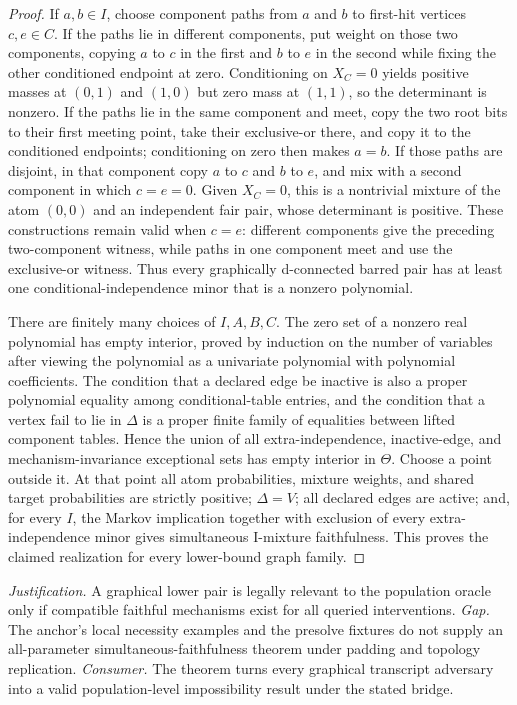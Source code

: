 \documentclass{article}
\begin{document}
\begin{proof}
If \(a,b\in I\), choose component paths from \(a\) and \(b\) to first-hit vertices \(c,e\in C\). If the paths lie in different components, put weight on those two components, copying \(a\) to \(c\) in the first and \(b\) to \(e\) in the second while fixing the other conditioned endpoint at zero. Conditioning on \(X_C=0\) yields positive masses at \((0,1)\) and \((1,0)\) but zero mass at \((1,1)\), so the determinant is nonzero. If the paths lie in the same component and meet, copy the two root bits to their first meeting point, take their exclusive-or there, and copy it to the conditioned endpoints; conditioning on zero then makes \(a=b\). If those paths are disjoint, in that component copy \(a\) to \(c\) and \(b\) to \(e\), and mix with a second component in which \(c=e=0\). Given \(X_C=0\), this is a nontrivial mixture of the atom \((0,0)\) and an independent fair pair, whose determinant is positive. These constructions remain valid when \(c=e\): different components give the preceding two-component witness, while paths in one component meet and use the exclusive-or witness. Thus every graphically d-connected barred pair has at least one conditional-independence minor that is a nonzero polynomial.

There are finitely many choices of \(I,A,B,C\). The zero set of a nonzero real polynomial has empty interior, proved by induction on the number of variables after viewing the polynomial as a univariate polynomial with polynomial coefficients. The condition that a declared edge be inactive is also a proper polynomial equality among conditional-table entries, and the condition that a vertex fail to lie in \(\Delta\) is a proper finite family of equalities between lifted component tables. Hence the union of all extra-independence, inactive-edge, and mechanism-invariance exceptional sets has empty interior in \(\Theta\). Choose a point outside it. At that point all atom probabilities, mixture weights, and shared target probabilities are strictly positive; \(\Delta=V\); all declared edges are active; and, for every \(I\), the Markov implication together with exclusion of every extra-independence minor gives simultaneous I-mixture faithfulness. This proves the claimed realization for every lower-bound graph family.
\end{proof}
\par\smallskip\noindent \textit{Justification.} A graphical lower pair is legally relevant to the population oracle only if compatible faithful mechanisms exist for all queried interventions. \textit{Gap.} The anchor's local necessity examples and the presolve fixtures do not supply an all-parameter simultaneous-faithfulness theorem under padding and topology replication. \textit{Consumer.} The theorem turns every graphical transcript adversary into a valid population-level impossibility result under the stated bridge.
\end{document}
